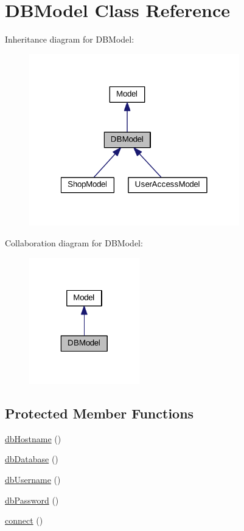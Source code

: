 \hypertarget{classDBModel}{\section{D\+B\+Model Class Reference}
\label{classDBModel}
}


Inheritance diagram for D\+B\+Model\+:
\nopagebreak
\begin{figure}[H]
\begin{center}
\leavevmode
\includegraphics[width=259pt]{classDBModel__inherit__graph}
\end{center}
\end{figure}


Collaboration diagram for D\+B\+Model\+:\nopagebreak
\begin{figure}[H]
\begin{center}
\leavevmode
\includegraphics[width=136pt]{classDBModel__coll__graph}
\end{center}
\end{figure}
\subsection*{Protected Member Functions}
\begin{DoxyCompactItemize}
\item 
\hyperlink{classDBModel_af39102ef1235d8f2993208bc320ad0ce}{db\+Hostname} ()
\item 
\hyperlink{classDBModel_a8114bdda6fb2b260ce3c56710d0f9d1c}{db\+Database} ()
\item 
\hyperlink{classDBModel_a17aab9a5c0364118192c892e8dbd55f0}{db\+Username} ()
\item 
\hyperlink{classDBModel_a8596b488008a8b12a6dce706490fb68b}{db\+Password} ()
\item 
\hyperlink{classDBModel_ad54a4dc85f41f25cbf7675b712d5d5ff}{connect} ()
\end{DoxyCompactItemize}
